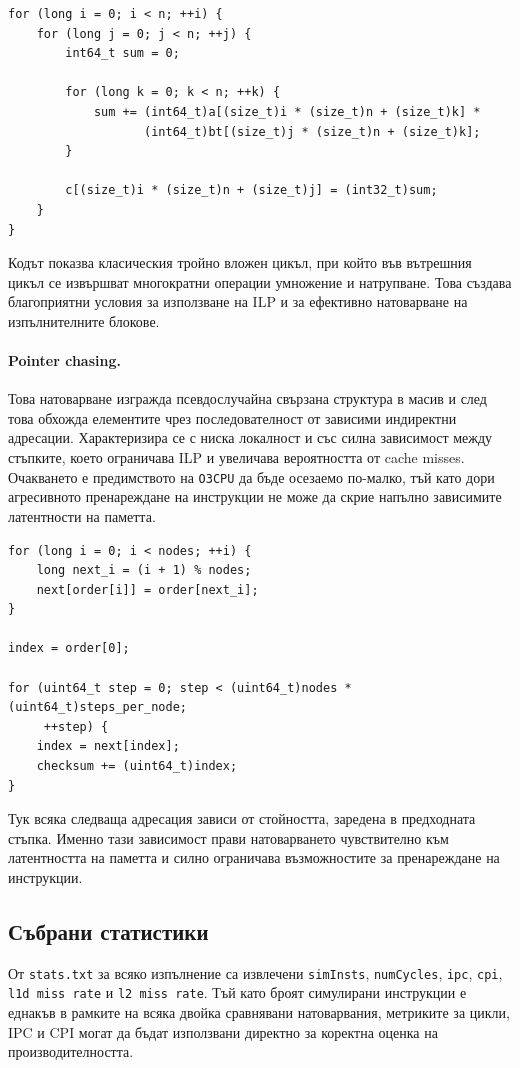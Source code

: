 \documentclass[12pt,a4paper]{article}
\begin{document}
\begin{lstlisting}[style=csmall,caption={Откъс от benchmark-а за матрично умножение},label={lst:matrix}]
for (long i = 0; i < n; ++i) {
    for (long j = 0; j < n; ++j) {
        int64_t sum = 0;

        for (long k = 0; k < n; ++k) {
            sum += (int64_t)a[(size_t)i * (size_t)n + (size_t)k] *
                   (int64_t)bt[(size_t)j * (size_t)n + (size_t)k];
        }

        c[(size_t)i * (size_t)n + (size_t)j] = (int32_t)sum;
    }
}
\end{lstlisting}

Кодът показва класическия тройно вложен цикъл, при който във вътрешния цикъл се извършват многократни операции умножение и натрупване. Това създава благоприятни условия за използване на ILP и за ефективно натоварване на изпълнителните блокове.

\paragraph{Pointer chasing.}
Това натоварване изгражда псевдослучайна свързана структура в масив и след това обхожда елементите чрез последователност от зависими индиректни адресации. Характеризира се с ниска локалност и със силна зависимост между стъпките, което ограничава ILP и увеличава вероятността от cache misses. Очакването е предимството на \texttt{O3CPU} да бъде осезаемо по-малко, тъй като дори агресивното пренареждане на инструкции не може да скрие напълно зависимите латентности на паметта.

\begin{lstlisting}[style=csmall,caption={Откъс от benchmark-а за pointer chasing},label={lst:pointer}]
for (long i = 0; i < nodes; ++i) {
    long next_i = (i + 1) % nodes;
    next[order[i]] = order[next_i];
}

index = order[0];

for (uint64_t step = 0; step < (uint64_t)nodes * (uint64_t)steps_per_node;
     ++step) {
    index = next[index];
    checksum += (uint64_t)index;
}
\end{lstlisting}

Тук всяка следваща адресация зависи от стойността, заредена в предходната стъпка. Именно тази зависимост прави натоварването чувствително към латентността на паметта и силно ограничава възможностите за пренареждане на инструкции.

\subsection{Събрани статистики}
От \texttt{stats.txt} за всяко изпълнение са извлечени \texttt{simInsts}, \texttt{numCycles}, \texttt{ipc}, \texttt{cpi}, \texttt{l1d miss rate} и \texttt{l2 miss rate}. Тъй като броят симулирани инструкции е еднакъв в рамките на всяка двойка сравнявани натоварвания, метриките за цикли, IPC и CPI могат да бъдат използвани директно за коректна оценка на производителността.
\end{document}

